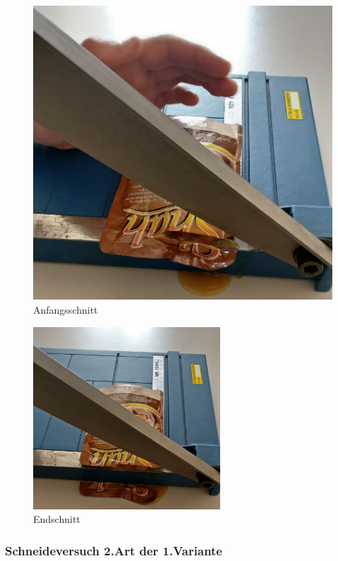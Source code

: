 \documentclass[a4paper,12pt]{scrartcl}
\begin{document}
\begin{figure}[H]
\begin{minipage}[hbt]{.5\linewidth}
      \includegraphics[width=\linewidth]{Bilder/Schneideversuch_1.Art/Anfangsschnitt}
      \caption{Anfangsschnitt}
   \end{minipage}
\end{figure}

\begin{figure}[H]
\begin{center}
\includegraphics[width=7cm]{Bilder/Schneideversuch_1.Art/Endschnitt}
\caption{Endschnitt}
\end{center}
\end{figure}
\newpage
\subsubsection{Schneideversuch 2.Art der 1.Variante}
\end{document}
